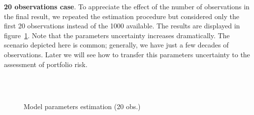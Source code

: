 \documentclass[11pt,fleqn]{book} %
\begin{document}
\begin{example}
	\textbf{20 observations case}. To appreciate the effect of the number of 
	observations in the final result, we repeated the estimation procedure 
	but considered only the first 20 observations instead of the \num{1000}
	available. The results are displayed in figure~\ref{fig:calib3}. Note 
	that the parameters uncertainty increases dramatically. The scenario 
	depicted here is common; generally, we have just a few decades of 
	observations. Later we will see how to transfer this parameters 
	uncertainty to the assessment of portfolio risk.
	\begin{figure}[!ht]
		\centering
		\hfill
		\\
		\\
		\caption{Model parameters estimation (20 obs.)}
		\label{fig:calib3}
	\end{figure}

\end{example}
\end{document}
